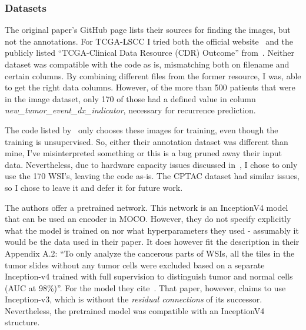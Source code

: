 \documentclass[10pt,twocolumn,letterpaper]{article}
\begin{document}
\subsubsection{Datasets}
The original paper's GitHub page lists their sources for finding the images, but not the annotations. For \gls{TCGA}-\gls{LSCC} I tried both the official website~\cite{tcgaAnnotation} and the publicly listed ``\gls{TCGA}-Clinical Data Resource (CDR) Outcome'' from~\cite{pancan}. Neither dataset was compatible with the code as is, mismatching both on filename and certain columns. By combining different files from the former resource, I was, able to get the right data columns. However, of the more than 500 patients that were in the image dataset, only 170 of those had a defined value in column \textit{new\_tumor\_event\_dx\_indicator}, necessary for recurrence prediction. 

The code listed by~\cite{sslUMAP} only chooses these images for training, even though the training is unsupervised. So, either their annotation dataset was different than mine, I've misinterpreted something or this is a bug pruned away their input data. Nevertheless, due to hardware capacity issues discussed in~, I chose to only use the 170 \gls{WSI}'s, leaving the code as-is. The CPTAC dataset had similar issues, so I chose to leave it and defer it for future work.

The authors offer a pretrained network. This network is an InceptionV4 model that can be used an encoder in \gls{MOCO}. However, they do not specify explicitly what the model is trained on nor what hyperparameters they used - assumably it would be the data used in their paper. It does however fit the description in their Appendix A.2: ``To only analyze the cancerous parts of WSIs, all the tiles in the tumor slides without any tumor cells were excluded based on a separate Inception-v4 trained with full supervision to distinguish tumor and normal
cells (AUC at 98\%)''. For the model they cite~\cite{coudray2018classification}. That paper, however, claims to use Inception-v3, which is without the \textit{residual connections} of its successor. Nevertheless, the pretrained model was compatible with an InceptionV4 structure.
\end{document}
